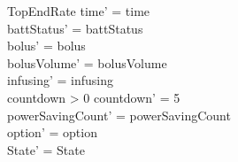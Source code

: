 \begin{schema}{TopEndRate}
	time' = time\\
	battStatus' = battStatus\\
	bolus' = bolus\\
	\pagebreak
	bolusVolume' = bolusVolume\\
	infusing' = infusing\\
	countdown > 0 \land countdown' = 5\\
	powerSavingCount' = powerSavingCount\\ 
	option' = option\\
	State' = State\\
\end{schema}

